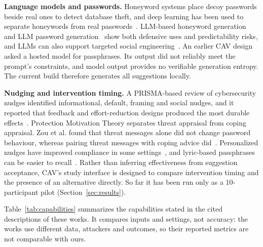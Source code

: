 \documentclass[preprint,12pt]{elsarticle}
\begin{document}
\textbf{Language models and passwords.} Honeyword systems place decoy passwords beside real ones to detect database theft, and deep learning has been used to separate honeywords from real passwords~\cite{dani}. LLM-based honeyword generation~\cite{umejiaku2025} and LLM password generation~\cite{kagnici} show both defensive uses and predictability risks, and LLMs can also support targeted social engineering~\cite{sai}. An earlier CAV design asked a hosted model for passphrases. Its output did not reliably meet the prompt's constraints, and model output provides no verifiable generation entropy. The current build therefore generates all suggestions locally.

\textbf{Nudging and intervention timing.} A PRISMA-based review of cybersecurity nudges identified informational, default, framing and social nudges, and it reported that feedback and effort-reduction designs produced the most durable effects~\cite{arciulo}. Protection Motivation Theory separates threat appraisal from coping appraisal. Zou et al. found that threat messages alone did not change password behaviour, whereas pairing threat messages with coping advice did~\cite{zou}. Personalized nudges have improved compliance in some settings~\cite{peer}, and lyric-based passphrases can be easier to recall~\cite{wise}. Rather than inferring effectiveness from suggestion acceptance, CAV's study interface is designed to compare intervention timing and the presence of an alternative directly. So far it has been run only as a 10-participant pilot (Section~\ref{sec:results}).

Table~\ref{tab:capabilities} summarizes the capabilities stated in the cited descriptions of these works. It compares inputs and settings, not accuracy: the works use different data, attackers and outcomes, so their reported metrics are not comparable with ours.
\end{document}
